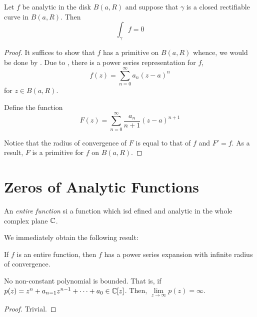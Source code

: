 \begin{proposition}
    Let $f$ be analytic in the disk $B(a,R)$ and suppose that $\gamma$ is a closed rectifiable curve in $B(a,R)$. Then 
    \begin{equation*}
        \int_\gamma f = 0
    \end{equation*}
\end{proposition}
\begin{proof}
    It suffices to show that $f$ has a primitive on $B(a,R)$ whence, we would be done by . Due to , there is a power series representation for $f$, 
    \begin{equation*}
        f(z) = \sum_{n = 0}^\infty a_n(z - a)^n
    \end{equation*}
    for $z\in B(a,R)$.

    Define the function 
    \begin{equation*}
        F(z) = \sum_{n = 0}^\infty\frac{a_n}{n + 1}(z - a)^{n + 1}
    \end{equation*}

    Notice that the radius of convergence of $F$ is equal to that of $f$ and $F' = f$. As a result, $F$ is a primitive for $f$ on $B(a,R)$.
\end{proof}

\section{Zeros of Analytic Functions}

\begin{definition}
    An \textit{entire function} si a function which isd efined and analytic in the whole complex plane $\mathbb{C}$.
\end{definition}

We immediately obtain the following result: 
\begin{proposition}
    If $f$ is an entire function, then $f$ has a power series expansion with infinite radius of convergence.
\end{proposition}

\begin{lemma}
    No non-constant polynomial is bounded. That is, if $p(z) = z^n + a_{n - 1}z^{n - 1} + \cdots + a_0\in\mathbb{C}[z]$. Then, $\lim\limits_{z\to\infty} p(z) = \infty$.
\end{lemma}
\begin{proof}
    Trivial.
\end{proof}


